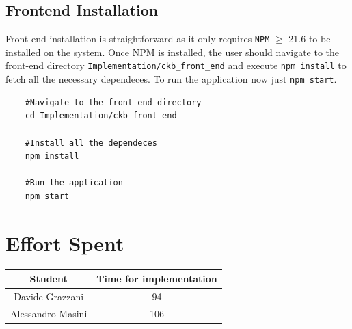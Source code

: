 \documentclass[table, 12pt]{article}
\begin{document}
\subsection{Frontend Installation}
Front-end installation is straightforward as it only requires \texttt{NPM} \(\geq\) 21.6 to be installed on the system.
Once NPM is installed, the user should navigate to the front-end directory \texttt{Implementation/ckb\_front\_end} and execute \texttt{npm install} to fetch all the necessary dependeces.
To run the application now just \texttt{npm start}.
\begin{lstlisting}
    #Navigate to the front-end directory
    cd Implementation/ckb_front_end

    #Install all the dependeces
    npm install

    #Run the application
    npm start
\end{lstlisting}

\newpage
\section{Effort Spent}
    \begin{tabular}{|c||c|}
        \hline
        Student & Time for implementation\\ \hline
        Davide Grazzani & 94 \\
        Alessandro Masini &  106 \\
        \hline
    \end{tabular}
\end{document}
